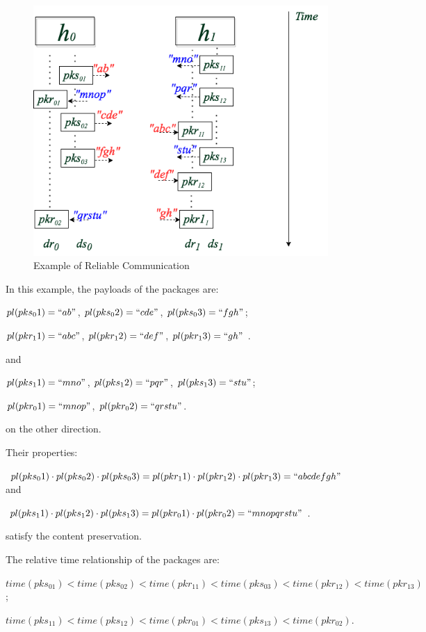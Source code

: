 \begin{figure}[H]
\centerline{\includegraphics[scale=0.55]{Figures/reliableexample}}
\caption{Example of Reliable Communication}
\label{reliableexample}
\end{figure}

In this example, the payloads of the packages are:

$pl(pks_01)=``ab"$, $ pl(pks_02)=``cde"$, $pl(pks_03)=``fgh"$;

$pl(pkr_11)=``abc"$, $pl(pkr_12)=``def"$, $pl(pkr_13)=``gh"$ .

and 

$pl(pks_11)=``mno"$, $pl(pks_12)=``pqr"$, $pl(pks_13)=``stu"$;

$pl(pkr_01)=``mnop"$, $pl(pkr_02)=``qrstu"$. 

on the other direction. 

Their properties:

$pl(pks_01) \cdot pl(pks_02) \cdot pl(pks_03) = pl(pkr_11) \cdot pl(pkr_12) \cdot pl(pkr_13) = ``abcdefgh"$ and 

$pl(pks_11) \cdot pl(pks_12) \cdot pl(pks_13) = pl(pkr_01) \cdot pl(pkr_02) = ``mnopqrstu"$. 

satisfy the content preservation. 

The relative time relationship of the packages are: 

$time(pks_01) < time(pks_02) < time(pkr_11)< time(pks_03) < time(pkr_12) < time(pkr_13) $;

$time(pks_11) < time(pks_12) < time(pkr_01)< time(pks_13) < time(pkr_02)$. 

